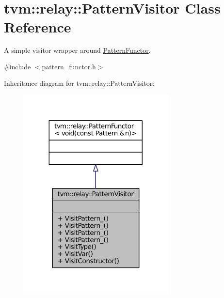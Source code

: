 \hypertarget{classtvm_1_1relay_1_1PatternVisitor}{}\section{tvm\+:\+:relay\+:\+:Pattern\+Visitor Class Reference}
\label{classtvm_1_1relay_1_1PatternVisitor}


A simple visitor wrapper around \hyperlink{classtvm_1_1relay_1_1PatternFunctor}{Pattern\+Functor}.  




{\ttfamily \#include $<$pattern\+\_\+functor.\+h$>$}



Inheritance diagram for tvm\+:\+:relay\+:\+:Pattern\+Visitor\+:
\nopagebreak
\begin{figure}[H]
\begin{center}
\leavevmode
\includegraphics[width=224pt]{classtvm_1_1relay_1_1PatternVisitor__inherit__graph}
\end{center}
\end{figure}


